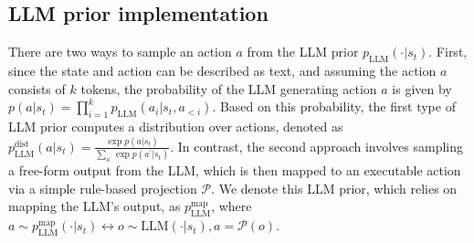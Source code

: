 \subsection{LLM prior implementation}
There are two ways to sample an action $a$ from the LLM prior $p_{\text{LLM}}(\cdot | s_t)$. First, since the state and action can be described as text, and assuming the action $a$ consists of $k$ tokens, the probability of the LLM generating action $a$ is given by $p(a | s_t) = \prod_{i=1}^k p_{\text{LLM}}(a_i | s_t, a_{<i})$. Based on this probability, the first type of LLM prior computes a distribution over actions, denoted as $p_{\text{LLM}}^{\text{dist}}(a | s_t) = \frac{\exp p(a | s_t)}{\sum_{a^\prime} \exp p(a^\prime | s_t)}$. In contrast, the second approach involves sampling a free-form output from the LLM, which is then mapped to an executable action via a simple rule-based projection $\mathcal{P}$. We denote this LLM prior, which relies on mapping the LLM's output, as $p_{\text{LLM}}^{\text{map}}$, where $a \sim p_{\text{LLM}}^{\text{map}}(\cdot | s_t) \leftrightarrow o \sim \text{LLM}(\cdot | s_t), a = \mathcal{P}(o)$.




